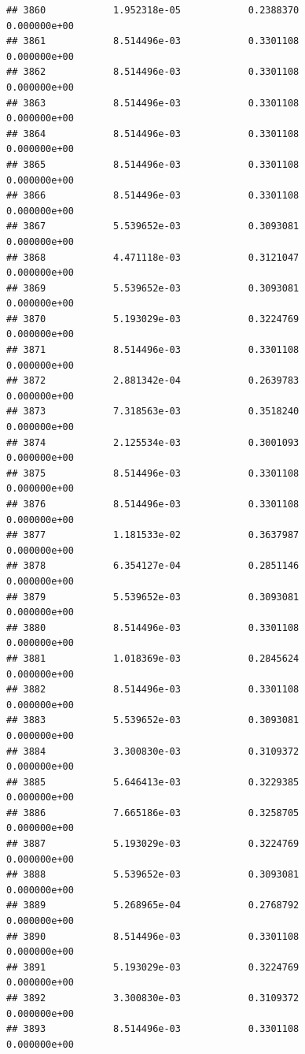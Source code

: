\documentclass[
]{article}
\begin{document}
\begin{verbatim}
## 3860            1.952318e-05            0.2388370            0.000000e+00
## 3861            8.514496e-03            0.3301108            0.000000e+00
## 3862            8.514496e-03            0.3301108            0.000000e+00
## 3863            8.514496e-03            0.3301108            0.000000e+00
## 3864            8.514496e-03            0.3301108            0.000000e+00
## 3865            8.514496e-03            0.3301108            0.000000e+00
## 3866            8.514496e-03            0.3301108            0.000000e+00
## 3867            5.539652e-03            0.3093081            0.000000e+00
## 3868            4.471118e-03            0.3121047            0.000000e+00
## 3869            5.539652e-03            0.3093081            0.000000e+00
## 3870            5.193029e-03            0.3224769            0.000000e+00
## 3871            8.514496e-03            0.3301108            0.000000e+00
## 3872            2.881342e-04            0.2639783            0.000000e+00
## 3873            7.318563e-03            0.3518240            0.000000e+00
## 3874            2.125534e-03            0.3001093            0.000000e+00
## 3875            8.514496e-03            0.3301108            0.000000e+00
## 3876            8.514496e-03            0.3301108            0.000000e+00
## 3877            1.181533e-02            0.3637987            0.000000e+00
## 3878            6.354127e-04            0.2851146            0.000000e+00
## 3879            5.539652e-03            0.3093081            0.000000e+00
## 3880            8.514496e-03            0.3301108            0.000000e+00
## 3881            1.018369e-03            0.2845624            0.000000e+00
## 3882            8.514496e-03            0.3301108            0.000000e+00
## 3883            5.539652e-03            0.3093081            0.000000e+00
## 3884            3.300830e-03            0.3109372            0.000000e+00
## 3885            5.646413e-03            0.3229385            0.000000e+00
## 3886            7.665186e-03            0.3258705            0.000000e+00
## 3887            5.193029e-03            0.3224769            0.000000e+00
## 3888            5.539652e-03            0.3093081            0.000000e+00
## 3889            5.268965e-04            0.2768792            0.000000e+00
## 3890            8.514496e-03            0.3301108            0.000000e+00
## 3891            5.193029e-03            0.3224769            0.000000e+00
## 3892            3.300830e-03            0.3109372            0.000000e+00
## 3893            8.514496e-03            0.3301108            0.000000e+00

\end{verbatim}
\end{document}
